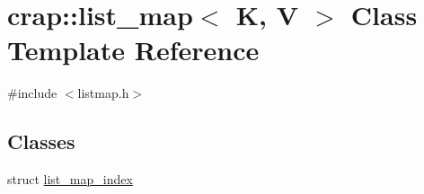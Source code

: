 \hypertarget{classcrap_1_1list__map}{\section{crap\+:\+:list\+\_\+map$<$ K, V $>$ Class Template Reference}
\label{classcrap_1_1list__map}
}


{\ttfamily \#include $<$listmap.\+h$>$}

\subsection*{Classes}
\begin{DoxyCompactItemize}
\item 
struct \hyperlink{structcrap_1_1list__map_1_1list__map__index}{list\+\_\+map\+\_\+index}
\end{DoxyCompactItemize}
